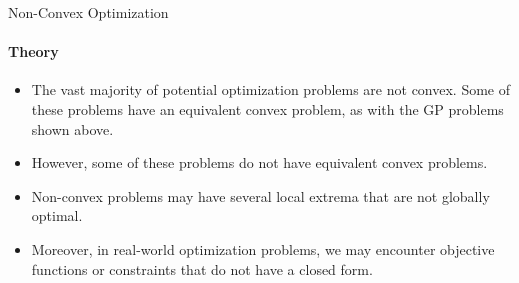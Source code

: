 \documentclass{beamer}
\begin{document}
%
%	
	\begin{frame}{Non-Convex Optimization}
		\framesubtitle{Theory}
		\begin{itemize}
			\item The vast majority of potential optimization problems are not convex. Some of these problems have an equivalent convex problem, as with the GP problems shown above.
			\item However, some of these problems do not have equivalent convex problems.
			\item Non-convex problems may have several local extrema that are not globally optimal.
			\item Moreover, in real-world optimization problems, we may encounter objective functions or constraints that do not have a closed form.
		\end{itemize}
	\end{frame}
%	
\end{document}
